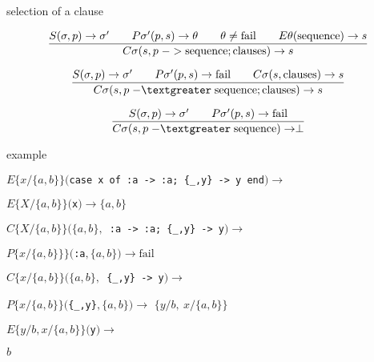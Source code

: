 \begin{frame}{selection of a clause}

$$\frac{
  S(\sigma, p) \rightarrow \sigma' \qquad
  P\sigma'(p, s) \rightarrow \theta \qquad
  \theta \not = {\rm fail} \qquad
  E\theta({\rm sequence}) \rightarrow s}{
C\sigma(s, p \;{\rm ->}\;    {\rm sequence} ; {\rm clauses}) \rightarrow s}$$

\pause \vspace{10pt}

$$\frac{
  S(\sigma, p) \rightarrow \sigma'   \qquad
  P\sigma'(p, s) \rightarrow {\rm fail} \qquad
  C\sigma(s, {\rm clauses}) \rightarrow s}{
C\sigma(s, p \;{\rm -\textgreater}\;  {\rm sequence} ; {\rm clauses}) \rightarrow s}$$

\pause \vspace{10pt}

$$\frac{
  S(\sigma, p) \rightarrow \sigma' \qquad
  P\sigma'(p, s) \rightarrow {\rm fail} }{
C\sigma(s, p \;{\rm -\textgreater}\;  {\rm sequence}) \rightarrow \perp}$$


\end{frame}

\begin{frame}{example}

\begin{eval}
  \pause$E\lbrace x/\lbrace a,b\rbrace\rbrace(${\tt case x of :a -> :a; \{\_,y\} -> y end}$) \rightarrow$ 
\end{eval}

\begin{eval}
   \hspace{40pt}\pause$E\lbrace X/\lbrace a,b\rbrace\rbrace(${\tt x}$) \rightarrow \lbrace a,b\rbrace$
\end{eval}

\begin{eval}
   \pause $C\lbrace X/\lbrace a,b\rbrace\rbrace(\lbrace a,b\rbrace, ${\tt \ :a -> :a; \{\_,y\} -> y}$) \rightarrow$ 
\end{eval}
\begin{eval}
   \hspace{40pt}\pause $P\lbrace x/\lbrace a,b\rbrace\rbrace\rbrace( ${\tt :a}$, \lbrace a,b\rbrace) \rightarrow \mathrm{fail}$
\end{eval}

\begin{eval}
   \pause $C\lbrace x/\lbrace a,b\rbrace\rbrace(\lbrace a,b\rbrace, ${\tt \  \{\_,y\} -> y}$) \rightarrow$ 
\end{eval}
\begin{eval}
   \hspace{40pt}\pause $P\lbrace x/\lbrace a,b\rbrace\rbrace(${\tt \{\_,y\}}$, \lbrace a,b\rbrace) \rightarrow $ \pause $\lbrace y/b,\  x/\lbrace a,b\rbrace\rbrace$
\end{eval}

\begin{eval}
  \pause$E\lbrace y/b, x/\lbrace a,b\rbrace\rbrace(${\tt y}$) \rightarrow $
\end{eval}
\begin{eval}
  \pause$b$
\end{eval}
  
\end{frame}


